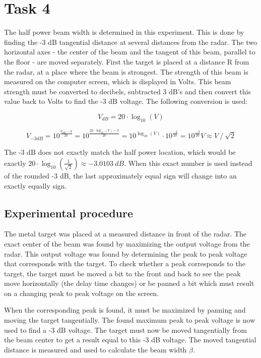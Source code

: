 \documentclass[final]{scrreprt} %
\begin{document}
\chapter{Task 4}
The half power beam width is determined in this experiment. This is done by finding the -3 dB tangential distance at several distances from the radar. The two horizontal axes - the center of the beam and the tangent of this beam, parallel to the floor - are moved separately. First the target is placed at a distance R from the radar, at a place where the beam is strongest. The strength of this beam is measured on the computer screen, which is displayed in Volts. This beam strength must be converted to decibels, subtracted 3 dB's and then convert this value back to Volts to find the -3 dB voltage. The following conversion is used:

\begin{equation}
	V_{dB} = 20 \cdot \log_{10} (V)
\end{equation}

\begin{equation}
	V_{-3 dB} = 10^{\frac{V_{dB} - 3}{20}} = 10^{\frac{20 \cdot \log_{10}(V) - 3}{20}} = 10^{\log_{10}(V)} \cdot 10^{\frac{-3}{20}} = 10^{\frac{-3}{20}} V \approx V~/~\sqrt{2}
\end{equation}

The -3 dB does not exactly match the half power location, which would be exactly $20 \cdot \log_{10} (\frac{1}{\sqrt{2}}) \approx -3.0103~dB $. When this exact number is used instead of the rounded -3 dB, the last approximately equal sign will change into an exactly equally sign.

\section{Experimental procedure}
The metal target was placed at a measured distance in front of the radar. The exact center of the beam was found by maximizing the output voltage from the radar. This output voltage was found by determining the peak to peak voltage that corresponds with the target. To check whether a peak corresponds to the target, the target must be moved a bit to the front and back to see the peak move horizontally (the delay time changes) or be panned a bit which must result on a changing peak to peak voltage on the screen.

When the corresponding peak is found, it must be maximized by panning and moving the target tangentially. The found maximum peak to peak voltage is now used to find a -3 dB voltage. The target must now be moved tangentially from the beam center to get a result equal to this -3 dB voltage. The moved tangential distance is measured and used to calculate the beam width $\beta$.
\end{document}
